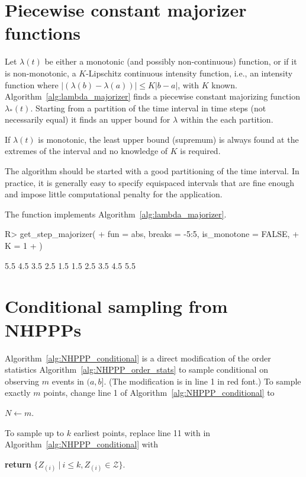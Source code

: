 \documentclass[article,nojss]{jss}\usepackage[]{graphicx}\usepackage[]{xcolor}
\newcommand{\fct}[1]{\code{#1()}}
\begin{document}
\newpage
\begin{appendix}

\section{Piecewise constant majorizer functions}\label{app:piecewise_majorizer}

Let $\lambda(t)$ be either a monotonic (and possibly non-continuous) function, or if it is non-monotonic, a $K$-Lipschitz continuous intensity function, i.e., an intensity function where $|(\lambda(b) - \lambda(a))| \le K|b-a|$, with $K$ known.   Algorithm~\ref{alg:lambda_majorizer} finds a piecewise constant majorizing function $\lambda_*(t)$. Starting from a partition of the time interval in time steps (not necessarily equal) it finds an upper bound for $\lambda$ within the each partition.

If $\lambda(t)$ is monotonic, the least upper bound (supremum) is always found at the extremes of the interval and no knowledge of $K$ is required.

The algorithm should be started with a good partitioning of the time interval. In practice, it is generally easy to specify equispaced intervals that are fine enough and impose little computational penalty for the application.

The 
function \fct{get\_step\_majorizer} implements Algorithm~\ref{alg:lambda_majorizer}. %

\begin{Schunk}
\begin{Sinput}
R> get_step_majorizer(
+    fun = abs, breaks = -5:5, is_monotone = FALSE,
+    K = 1
+  )
\end{Sinput}
\begin{Soutput}
 [1] 5.5 4.5 3.5 2.5 1.5 1.5 2.5 3.5 4.5 5.5
\end{Soutput}
\end{Schunk}





\newpage
\section{Conditional sampling from NHPPPs} \label{app:conditional_sampling}
Algorithm~\ref{alg:NHPPP_conditional} is a direct modification of the order statistics Algorithm~\ref{alg:NHPPP_order_stats} to sample conditional on observing $m$ events in $(a,b]$. (The modification is in line 1 in red font.)
To sample exactly $m$ points, change line 1 of Algorithm~\ref{alg:NHPPP_conditional} to
\begin{center}
$N \gets m$.
\end{center}
To sample up to $k$ earliest points, replace line 11 with in Algorithm~\ref{alg:NHPPP_conditional} with
\begin{center}
\textbf{return} {$\{Z_{(i)} \ | \ i \le k, Z_{(i)} \in \mathcal{Z}\}$}.
\end{center}


\end{appendix}
\end{document}
